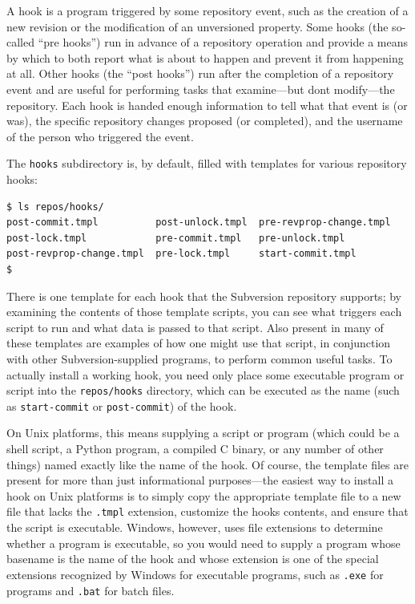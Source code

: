 A hook is a program triggered by some repository event, such as the
creation of a new revision or the modification of an unversioned
property. Some hooks (the so-called ``pre hooks'') run in advance of a
repository operation and provide a means by which to both report what is
about to happen and prevent it from happening at all. Other hooks (the
``post hooks'') run after the completion of a repository event and are
useful for performing tasks that examine---but don\textquotesingle t
modify---the repository. Each hook is handed enough information to tell
what that event is (or was), the specific repository changes proposed
(or completed), and the username of the person who triggered the event.

The \texttt{hooks} subdirectory is, by default, filled with templates
for various repository hooks:

\begin{verbatim}
$ ls repos/hooks/
post-commit.tmpl          post-unlock.tmpl  pre-revprop-change.tmpl
post-lock.tmpl            pre-commit.tmpl   pre-unlock.tmpl
post-revprop-change.tmpl  pre-lock.tmpl     start-commit.tmpl
$
\end{verbatim}

There is one template for each hook that the Subversion repository
supports; by examining the contents of those template scripts, you can
see what triggers each script to run and what data is passed to that
script. Also present in many of these templates are examples of how one
might use that script, in conjunction with other Subversion-supplied
programs, to perform common useful tasks. To actually install a working
hook, you need only place some executable program or script into the
\texttt{repos/hooks} directory, which can be executed as the name (such
as \texttt{start-commit} or \texttt{post-commit}) of the hook.

On Unix platforms, this means supplying a script or program (which could
be a shell script, a Python program, a compiled C binary, or any number
of other things) named exactly like the name of the hook. Of course, the
template files are present for more than just informational
purposes---the easiest way to install a hook on Unix platforms is to
simply copy the appropriate template file to a new file that lacks the
\texttt{.tmpl} extension, customize the hook\textquotesingle s contents,
and ensure that the script is executable. Windows, however, uses file
extensions to determine whether a program is executable, so you would
need to supply a program whose basename is the name of the hook and
whose extension is one of the special extensions recognized by Windows
for executable programs, such as \texttt{.exe} for programs and
\texttt{.bat} for batch files.


